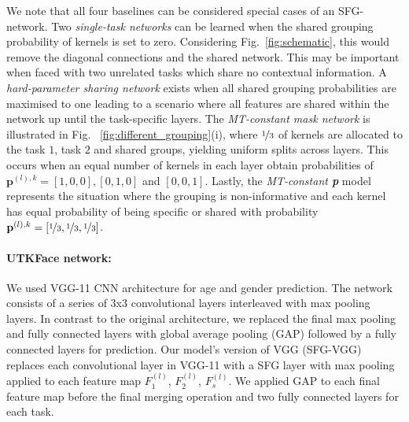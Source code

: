 We note that all four baselines can be considered special cases of an SFG-network. Two \emph{single-task networks} can be learned when the shared grouping probability of kernels is set to zero. Considering Fig.~\ref{fig:schematic}, this would remove the diagonal connections and the shared network. This may be important when faced with two unrelated tasks which share no contextual information. A \emph{hard-parameter sharing network} exists when all shared grouping probabilities are maximised to one leading to a scenario where all features are shared within the network up until the task-specific layers. The \emph{MT-constant mask network} is illustrated in Fig.~ \ref{fig:different_grouping}(i), where $\nicefrac{1}{3}$ of kernels are allocated to the task $1$, task $2$ and shared groups, yielding uniform splits across layers. This occurs when an equal number of kernels in each layer obtain probabilities of $\mathbf{p}^{(l),k}=[1, 0, 0], [0, 1, 0]$ and $[0, 0, 1]$. Lastly, the \emph{MT-constant \textbf{p}} model represents the situation where the grouping is non-informative and each kernel has equal probability of being specific or shared with probability $\mathbf{p}^{(l),k}=[\nicefrac{1}{3}, \nicefrac{1}{3}, \nicefrac{1}{3}]$. 

    \paragraph{UTKFace network:} We used VGG-11 CNN architecture \cite{vgg} for age and gender prediction. The network consists of a series of $3$x$3$ convolutional layers interleaved with max pooling layers. In contrast to the original architecture, we replaced the final max pooling and fully connected layers with global average pooling (GAP) followed by a fully connected layers for prediction. Our model's version of VGG (SFG-VGG) replaces each convolutional layer in VGG-11 with a SFG layer with max pooling applied to each feature map $F^{(l)}_{1}$, $F^{(l)}_{2}$, $F^{(l)}_{s}$. We applied GAP to each final feature map before the final merging operation and two fully connected layers for each task.
    
